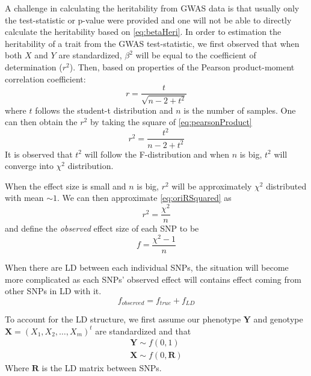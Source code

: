 			A challenge in calculating the heritability from \gls{GWAS} data is that usually only the test-statistic or p-value were provided and one will not be able to directly calculate the heritability based on \cref{eq:betaHeri}. In order to estimation the heritability of a trait from the \gls{GWAS} test-statistic, we first observed that when both $X$ and $Y$ are standardized, $\beta^2$ will be equal to the coefficient of determination ($r^2$). Then, based on properties of the Pearson product-moment correlation coefficient:
			\begin{equation}
				r = \frac{t}{\sqrt{n-2+t^2}}
				\label{eq:pearsonProduct}
			\end{equation}
			where $t$ follows the student-t distribution and $n$ is the number of samples.
			One can then obtain the $r^2$ by taking the square of \cref{eq:pearsonProduct}
			\begin{equation}
				r^2 = \frac{t^2}{n-2+t^2}
				\label{eq:oriRSquared}
			\end{equation}
			It is observed that $t^2$ will follow the F-distribution and when $n$ is big, $t^2$ will converge into $\chi^2$ distribution.
			
			When the effect size is small and $n$ is big, $r^2$ will be approximately $\chi^2$ distributed with mean $\sim 1$. 
			We can then approximate \cref{eq:oriRSquared} as
			\begin{equation}
				r^2= \frac{\chi^2}{n}
				\label{eq:approxChi}
			\end{equation}
			and define the \emph{observed} effect size of each \gls{SNP} to be
			\begin{equation}
			f=\frac{\chi^2-1}{n}
			\label{eq:observedEffect}
			\end{equation}
			
			When there are \gls{LD} between each individual \glspl{SNP}, the situation will become more complicated as each \glspl{SNP}' observed effect will contains effect coming from other \glspl{SNP} in \gls{LD} with it. 
			\begin{equation}
			f_{observed} = f_{true}+f_{LD}
			\label{eq:conceptF}
			\end{equation}
			
			To account for the \gls{LD} structure, we first assume our phenotype $\boldsymbol{Y}$ and genotype $\boldsymbol{X}=(X_1,X_2,\dots,X_m)^t$ are standardized and that
			\begin{align*}
				\boldsymbol{Y}\sim f(0,1) \\
				\boldsymbol{X}\sim f(0,\boldsymbol{R})
			\end{align*}
			Where $\boldsymbol{R}$ is the \gls{LD} matrix between \glspl{SNP}.
			
